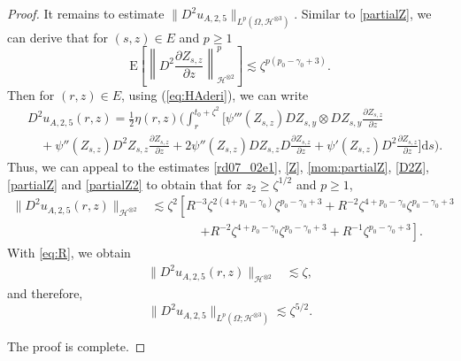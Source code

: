 \documentclass[12pt,a4paper]{article}
\newcommand{\E}{\mathrm{E}}
\newcommand{\HH}{\mathcal{H}}
\renewcommand{\d}{\mathrm{d}}
\newcommand {\deltah}{{\zeta}}
\newcommand{\<}{\langle}
\renewcommand{\>}{\rangle}
\begin{document}
\begin{proof}
          It remains to estimate  $\|D^2u_{A,2,5}\|_{L^p(\Omega, \HH^{\otimes3})}$. Similar to \eqref{partialZ}, we can derive that
          for $(s,z)\in E$ and $p\geq1$
                      \begin{equation} \label{partialZ2}
             \E\left[\left\|D^2\frac{\partial Z_{s,z}}{\partial z}\right\|_{\mathcal{H}^{\otimes 2}}^p \right] \lesssim \deltah^{p(p_0-\gamma_0+3)}.
           \end{equation}
           Then for $(r,z)\in E$,  using (\ref{eq:HAderi}), we can write
          \begin{align*}
          &D^2u_{A,2,5}(r,z) =\frac12 \eta(r,z)\bigg(\int_r^{t_0+\deltah^2}\Big[\psi'''(Z_{s, z})DZ_{s,y}\otimes
           DZ_{s,y} \frac{\partial Z_{s,z}}{\partial z} \\
         &\quad  +\psi''(Z_{s, z})D^2Z_{s,z} \frac{\partial Z_{s,z}}{\partial z} 
          +2 \psi''(Z_{s, z})DZ_{s,z} D\frac{\partial Z_{s,z}}{\partial z}
          + \psi'(Z_{s,z})D^2\frac{\partial Z_{s,z}}{\partial z} \Big]
          \d s\bigg).
          \end{align*}
          Thus, we can appeal to the estimates \eqref{rd07_02e1}, \eqref{Z}, \eqref{mom:partialZ}, \eqref{D2Z}, \eqref{partialZ} and \eqref{partialZ2}
          to obtain that for $z_2\geq \deltah^{1/2}$ and $p\geq1$,
\begin{align*}
    \|D^2u_{A,2,5}(r, z)\|_{\mathcal{H}^{\otimes 2}} &\lesssim \deltah^2 \left[R^{-3} \zeta^{2(4 + p_0 - \gamma_0)} \deltah^{p_0 - \gamma_0 +3} + R^{-2} \deltah^{4 + p_0 - \gamma_0} \deltah^{p_0 - \gamma_0 + 3} \right. \\
    &\qquad\qquad \left. + R^{-2}  \deltah^{4 + p_0 - \gamma_0} \deltah^{p_0 - \gamma_0 + 3}  + R^{-1} \deltah^{p_0 - \gamma_0 + 3}  \right].
\end{align*}
With \eqref{eq:R}, we obtain
\begin{align*}
    \|D^2u_{A,2,5}(r, z)\|_{\mathcal{H}^{\otimes 2}} &\lesssim \deltah,
\end{align*}
and therefore,
 \begin{equation*} 
              \|D^2u_{A,2,5}\|_{L^p(\Omega;\mathcal{H}^{\otimes3})} \lesssim \deltah^{5/2}.
 \end{equation*}
 
 The proof is complete. 
 \end{proof}
\end{document}
